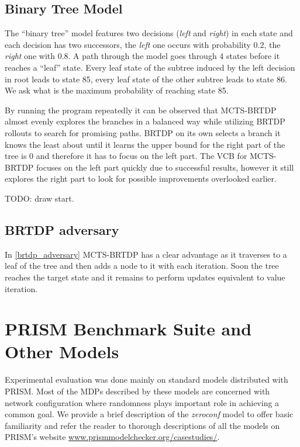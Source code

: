 \subsection*{Binary Tree Model}

The ``binary tree'' model features two decisions ({\em left} and {\em
right}) in each state and each decision has two successors,
the {\em left} one occurs with probability 0.2,
the {\em right} one with 0.8. A path through the model goes through 4 states
before it reaches a ``leaf'' state. Every leaf state of the subtree
induced by the left decision in root leads to state 85, every leaf state
of the other subtree leads to state 86. We ask what is the maximum
probability of reaching state 85.

By running the program repeatedly it can be observed that MCTS-BRTDP
almost evenly explores the branches in a balanced way while utilizing
BRTDP rollouts to search for promising paths. BRTDP on its own
selects a branch it knows the least about until it learns the upper bound
for the right part of the tree is 0 and therefore it has to focus on the
left part. The VCB for MCTS-BRTDP focuses on the left part quickly due
to successful results, however it still explores the right part to look
for possible improvements overlooked earlier.

TODO: draw start.

\subsection*{BRTDP adversary}

In \autoref{brtdp_adversary} MCTS-BRTDP has a clear advantage as it
traverses to a leaf of the tree and then adds a node to it with each iteration.
Soon the tree reaches the target state and it remains to perform updates
equivalent to value iteration.


\section{PRISM Benchmark Suite and Other Models}

Experimental evaluation was done mainly on standard models
distributed with PRISM. Most of the MDPs described by these models are
concerned with network configuration where randomness plays important
role in achieving a common goal. We provide a brief description of the
{\em zeroconf} model to offer basic familiarity and refer the reader to
thorough descriptions of all the models on PRISM's website
\href{http://www.prismmodelchecker.org/casestudies/}{www.prismmodelchecker.org/casestudies/}.

